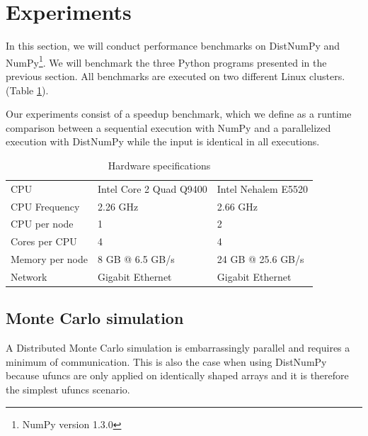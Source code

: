 \documentclass[10pt]{article}
\begin{document}
\section{Experiments}
In this section, we will conduct performance benchmarks on DistNumPy and NumPy\footnote{NumPy version 1.3.0}. We will benchmark the three Python programs presented in the previous section. All benchmarks are executed on two different Linux clusters. (Table \ref{tab:specs}).

Our experiments consist of a speedup benchmark, which we define as a runtime comparison between a sequential execution with NumPy and a parallelized execution with DistNumPy while the input is identical in all executions.



\begin{table}
\caption{Hardware specifications}
\centering
\begin{tabular}{|lll|}
\hline
CPU & Intel Core 2 Quad Q9400 & Intel Nehalem E5520\\
CPU Frequency & 2.26 GHz & 2.66 GHz\\
CPU per node & 1 & 2\\
Cores per CPU & 4 & 4\\
Memory per node & 8 GB @ 6.5 GB/s & 24 GB @ 25.6 GB/s\\
Network & Gigabit Ethernet & Gigabit Ethernet\\
\hline
\end{tabular}

\label{tab:specs}
\end{table}


\subsection{Monte Carlo simulation}
A Distributed Monte Carlo simulation is embarrassingly parallel and requires a minimum of communication.  This is also the case when using DistNumPy because ufuncs are only applied on identically shaped arrays and it is therefore the simplest ufuncs scenario.
\end{document}
